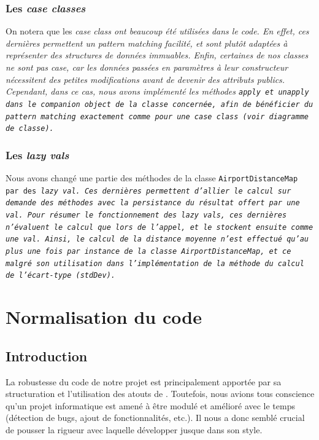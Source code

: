 \documentclass[a4paper, 12pt]{report}
\newcommand{\tech}[1]{\sf{#1}}
\newcommand{\en}[1]{\it{#1}}
\begin{document}
    \subsection{Les \en{case class}es}
    
    On notera que les \en{case class} ont beaucoup été utilisées dans le code. En effet, ces dernières permettent un \en{pattern matching} facilité, et sont plutôt adaptées à représenter des structures de données immuables. Enfin, certaines de nos classes ne sont pas \en{case}, car les données passées en paramètres à leur constructeur nécessitent des petites modifications avant de devenir des attributs publics. Cependant, dans ce cas, nous avons implémenté les méthodes \tt{apply} et \tt{unapply} dans le \en{companion object} de la classe concernée, afin de bénéficier du \en{pattern matching} exactement comme pour une \en{case class} (voir diagramme de classe).
    
    \subsection{Les \en{lazy val}s}
    
    Nous avons changé une partie des méthodes de la classe \tt{AirportDistanceMap} par des \en{lazy val}. Ces dernières permettent d'allier le calcul sur demande des méthodes avec la persistance du résultat offert par une \en{val}. Pour résumer le fonctionnement des \en{lazy val}s, ces dernières n'évaluent le calcul que lors de l'appel, et le stockent ensuite comme une \en{val}. Ainsi, le calcul de la distance moyenne n'est effectué qu'au plus une fois par instance de la classe \tt{AirportDistanceMap}, et ce malgré son utilisation dans l'implémentation de la méthode du calcul de l'écart-type (\tt{stdDev}).


    \chapter{Normalisation du code} %
    
    \section{Introduction}
    
    La robustesse du code de notre projet est principalement apportée par sa structuration et l'utilisation des atouts de \tech{Scala}. Toutefois, nous avions tous conscience qu'un projet informatique est amené à être modulé et amélioré avec le temps (détection de bugs, ajout de fonctionnalités, etc.). Il nous a donc semblé crucial de pousser la rigueur avec laquelle développer jusque dans son style.
    
\end{document}
